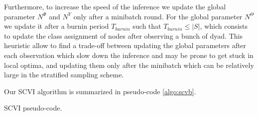 Furthermore, to increase the speed of the inference we update the global parameter $N^\Phi$ and $N^Y$ only after a minibatch round. For the global parameter $N^\Theta$ we update it after a burnin period $T_{burnin}$ such that $T_{burnin} \leq |S|$, which consists to update the class assignment of nodes after observing a bunch of dyad. This heuristic allow to find a trade-off between updating the global parameters after each observation which slow down the inference and may be prone to get stuck in local optima, and updating them only after the minibatch which can be relatively large in the stratified sampling scheme. 


Our SCVI algorithm is summarized in pseudo-code \ref{algo:scvb}.

\begin{algorithm}
\caption{SCVI pseudo-code.}
\label{algo:scvb}
\end{algorithm}


